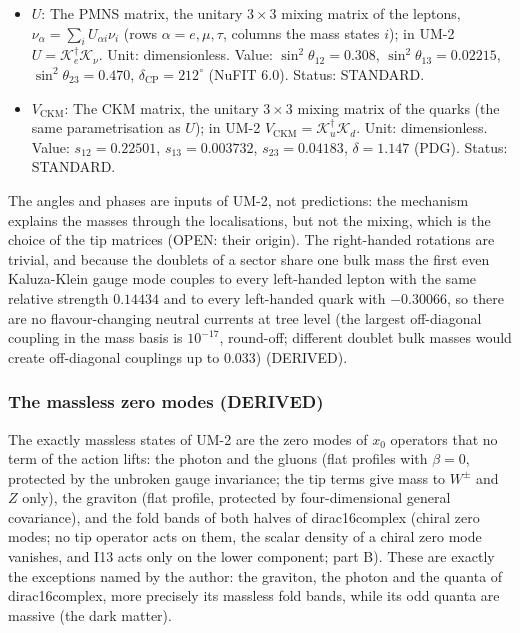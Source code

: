 \documentclass[
  10pt,
]{article}
\providecommand{\tightlist}{%
  \setlength{\itemsep}{0pt}\setlength{\parskip}{0pt}}
\begin{document}
\begin{itemize}
\tightlist
\item
  \(U\): The PMNS matrix, the unitary \(3 \times 3\) mixing matrix of
  the leptons, \(\nu_\alpha = \sum_iU_{\alpha i}\nu_i\) (rows
  \(\alpha = e, \mu, \tau\), columns the mass states \(i\)); in UM-2
  \(U = \mathcal{K}_e^\dagger\mathcal{K}_\nu\). Unit: dimensionless.
  Value: \(\sin^2\theta_{12} = 0.308\), \(\sin^2\theta_{13} = 0.02215\),
  \(\sin^2\theta_{23} = 0.470\), \(\delta_{\mathrm{CP}} = 212^\circ\)
  (NuFIT 6.0). Status: STANDARD.
\item
  \(V_{\mathrm{CKM}}\): The CKM matrix, the unitary \(3 \times 3\)
  mixing matrix of the quarks (the same parametrisation as \(U\)); in
  UM-2 \(V_{\mathrm{CKM}} = \mathcal{K}_u^\dagger\mathcal{K}_d\). Unit:
  dimensionless. Value: \(s_{12} = 0.22501\), \(s_{13} = 0.003732\),
  \(s_{23} = 0.04183\), \(\delta = 1.147\) (PDG). Status: STANDARD.
\end{itemize}

The angles and phases are inputs of UM-2, not predictions: the mechanism
explains the masses through the localisations, but not the mixing, which
is the choice of the tip matrices (OPEN: their origin). The right-handed
rotations are trivial, and because the doublets of a sector share one
bulk mass the first even Kaluza-Klein gauge mode couples to every
left-handed lepton with the same relative strength \(0.14434\) and to
every left-handed quark with \(-0.30066\), so there are no
flavour-changing neutral currents at tree level (the largest
off-diagonal coupling in the mass basis is \(10^{-17}\), round-off;
different doublet bulk masses would create off-diagonal couplings up to
\(0.033\)) (DERIVED).

\hypertarget{the-massless-zero-modes-derived}{%
\subsubsection*{The massless zero modes
(DERIVED)}\label{the-massless-zero-modes-derived}}

The exactly massless states of UM-2 are the zero modes of \(x_0\)
operators that no term of the action lifts: the photon and the gluons
(flat profiles with \(\beta = 0\), protected by the unbroken gauge
invariance; the tip terms give mass to \(W^\pm\) and \(Z\) only), the
graviton (flat profile, protected by four-dimensional general
covariance), and the fold bands of both halves of dirac16complex (chiral
zero modes; no tip operator acts on them, the scalar density of a chiral
zero mode vanishes, and I13 acts only on the lower component; part B).
These are exactly the exceptions named by the author: the graviton, the
photon and the quanta of dirac16complex, more precisely its massless
fold bands, while its odd quanta are massive (the dark matter).
\end{document}
